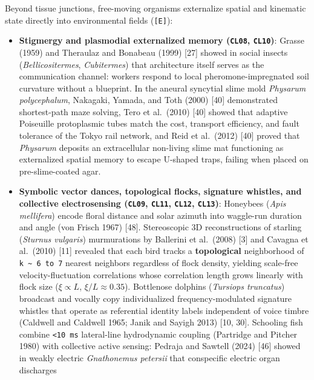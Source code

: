 \documentclass[10pt,letterpaper]{article}
\providecommand{\tightlist}{\setlength{\itemsep}{1pt}\setlength{\parskip}{0pt}}
\begin{document}
Beyond tissue junctions, free-moving organisms externalize spatial and
kinematic state directly into environmental fields (\texttt{{[}E{]}}):

\begin{itemize}
\tightlist
\item
  \textbf{Stigmergy and plasmodial externalized memory (\texttt{CL08},
  \texttt{CL10})}: Grasse (1959) and Theraulaz and Bonabeau (1999)
  {[}27{]} showed in social insects (\emph{Bellicositermes},
  \emph{Cubitermes}) that architecture itself serves as the
  communication channel: workers respond to local pheromone-impregnated
  soil curvature without a blueprint. In the aneural syncytial slime
  mold \emph{Physarum polycephalum}, Nakagaki, Yamada, and Toth (2000)
  {[}40{]} demonstrated shortest-path maze solving, Tero et al.~(2010)
  {[}40{]} showed that adaptive Poiseuille protoplasmic tubes match the
  cost, transport efficiency, and fault tolerance of the Tokyo rail
  network, and Reid et al.~(2012) {[}40{]} proved that \emph{Physarum}
  deposits an extracellular non-living slime mat functioning as
  externalized spatial memory to escape U-shaped traps, failing when
  placed on pre-slime-coated agar.
\item
  \textbf{Symbolic vector dances, topological flocks, signature
  whistles, and collective electrosensing (\texttt{CL09}, \texttt{CL11},
  \texttt{CL12}, \texttt{CL13})}: Honeybees (\emph{Apis mellifera})
  encode floral distance and solar azimuth into waggle-run duration and
  angle (von Frisch 1967) {[}48{]}. Stereoscopic 3D reconstructions of
  starling (\emph{Sturnus vulgaris}) murmurations by Ballerini et
  al.~(2008) {[}3{]} and Cavagna et al.~(2010) {[}11{]} revealed that
  each bird tracks a \textbf{topological} neighborhood of
  \texttt{k\ \textasciitilde{}\ 6\ to\ 7} nearest neighbors regardless
  of flock density, yielding scale-free velocity-fluctuation
  correlations whose correlation length grows linearly with flock size
  (\(\xi \propto L\), \(\xi / L \approx 0.35\)). Bottlenose dolphins
  (\emph{Tursiops truncatus}) broadcast and vocally copy individualized
  frequency-modulated signature whistles that operate as referential
  identity labels independent of voice timbre (Caldwell and Caldwell
  1965; Janik and Sayigh 2013) {[}10, 30{]}. Schooling fish combine
  \texttt{\textless{}10\ ms} lateral-line hydrodynamic coupling
  (Partridge and Pitcher 1980) with collective active sensing: Pedraja
  and Sawtell (2024) {[}46{]} showed in weakly electric
  \emph{Gnathonemus petersii} that conspecific electric organ discharges

\end{itemize}
\end{document}
